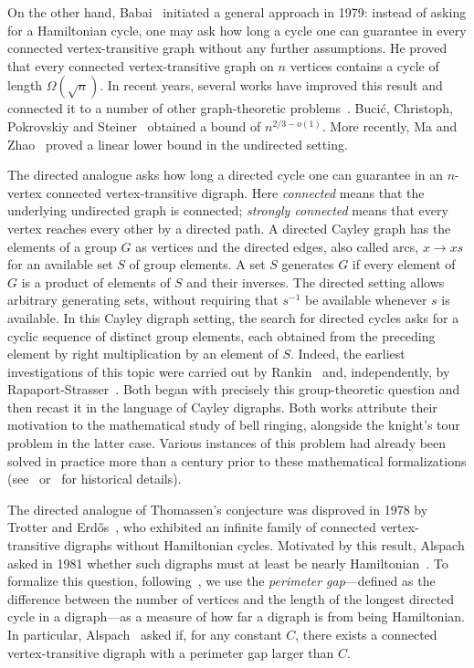 \documentclass[11pt,a4paper,reqno]{amsart}
\theoremstyle{definition}
\theoremstyle{remark}
\numberwithin{equation}{section}
\begin{document}
On the other hand, Babai~\cite{Babai} initiated a general approach in 1979: instead of asking for a Hamiltonian cycle, one may ask how long a cycle one can guarantee in every connected vertex-transitive graph without any further assumptions. He proved that every connected vertex-transitive graph on $n$ vertices contains a cycle of length $\Omega(\sqrt n)$. In recent years, several works have improved this result and connected it to a number of other graph-theoretic problems~\cite{DeVos,GLSTY,MaZhaoIntersections,NorinEtAl,BCPS}. Buci\'c, Christoph, Pokrovskiy and Steiner~\cite{BCPS} obtained a bound of $n^{2/3-o(1)}$. More recently, Ma and Zhao~\cite{MaZhaoLinear} proved a linear lower bound in the undirected setting.

The directed analogue asks how long a directed cycle one can guarantee in an $n$-vertex connected vertex-transitive digraph. Here \emph{connected} means that the underlying undirected graph is connected; \emph{strongly connected} means that every vertex reaches every other by a directed path. A directed Cayley graph has the elements of a group $G$ as vertices and the directed edges, also called arcs, $x\to xs$ for an available set $S$ of group elements. A set $S$ generates $G$ if every element of $G$ is a product of elements of $S$ and their inverses. The directed setting allows arbitrary generating sets, without requiring that $s^{-1}$ be available whenever $s$ is available. In this Cayley digraph setting, the search for directed cycles asks for a cyclic sequence of distinct group elements, each obtained from the preceding element by right multiplication by an element of $S$. Indeed, the earliest investigations of this topic were carried out by Rankin~\cite{Rankin} and, independently, by Rapaport-Strasser~\cite{Rapaport}. Both began with precisely this group-theoretic question and then recast it in the language of Cayley digraphs. Both works attribute their motivation to the mathematical study of bell ringing, alongside the knight's tour problem in the latter case. Various instances of this problem had already been solved in practice more than a century prior to these mathematical formalizations (see~\cite[Section 4]{Rankin} or~\cite{White} for historical details).

The directed analogue of Thomassen's conjecture was disproved in 1978 by Trotter and Erd\H{o}s~\cite{TrotterErdos}, who exhibited an infinite family of connected vertex-transitive digraphs without Hamiltonian cycles. Motivated by this result, Alspach asked in 1981 whether such digraphs must at least be nearly Hamiltonian~\cite{Alspach}. To formalize this question, following~\cite{BHMSY}, we use the \emph{perimeter gap}---defined as the difference between the number of vertices and the length of the longest directed cycle in a digraph---as a measure of how far a digraph is from being Hamiltonian. In particular, Alspach~\cite[Question 7]{Alspach} asked if, for any constant $C$, there exists a connected vertex-transitive digraph with a perimeter gap larger than $C$.
\end{document}
